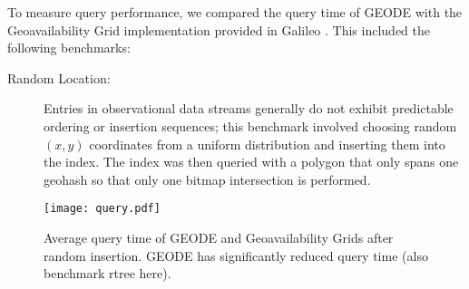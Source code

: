 To measure query performance, we compared the query time of GEODE with the Geoavailability Grid implementation provided in Galileo \cite{malensek2013polygon}. This included the following benchmarks:

\begin{description}
\item[Random Location:] Entries in observational data streams generally do not exhibit predictable ordering or insertion sequences; this benchmark involved choosing random $(x, y)$ coordinates from a uniform distribution and inserting them into the index. The index was then queried with a polygon that only spans one geohash so that only one bitmap intersection is performed.
\end{description}

\begin{figure}
    \centerline{\texttt{[image: query.pdf]}}
    \caption{Average query time of GEODE and Geoavailability Grids after random insertion. GEODE has significantly reduced query time (also benchmark rtree here).}
    \label{fig:mem}
\end{figure}


